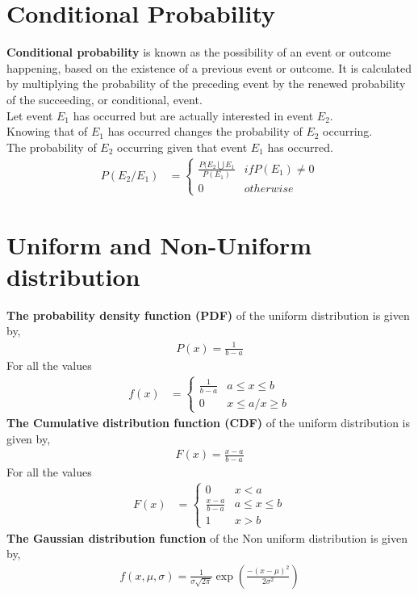 \documentclass[journal,15pt,twocolumn]{IEEEtran}
\begin{document}
\section {\textbf{Conditional Probability}}
\textbf{Conditional probability} is known as the possibility of an event or outcome happening, based on the existence of a previous event or outcome.
It is calculated by multiplying the probability of the preceding event by the renewed probability of the succeeding, or conditional, event.\\
Let event $E_1$ has occurred but are actually interested in event $E_2$.\\
Knowing that of $E_1$ has occurred changes the probability of $E_2$ occurring.\\
The probability of $E_2$ occurring given that event $E_1$ has occurred.
\begin{align}
P(E_2 / E_1) &= 
\begin{cases}
\frac{P(E_2\bigcup E_1}{P(E_1)} & if P(E_1) \neq 0\\
0 & otherwise
\end{cases}
\end{align}
\section {\textbf{Uniform and Non-Uniform distribution}}
\textbf{The probability density function (PDF)} of the uniform distribution is given by, 
\begin{align}
    P(x) = \frac{1}{b-a}
\end{align}
For all the values
\begin{align}
	f(x) &=
	\begin{cases}
		\frac{1}{b-a} & a\le x \le b\\
		0 & x \le a / x \ge b
	\end{cases}
\end{align}
\textbf{The Cumulative distribution function (CDF)} of the uniform distribution is given by, 
\begin{align}
    F(x) = \frac{x-a}{b-a}
\end{align}
For all the values
\begin{align}
	F(x) &=
	\begin{cases}
            0 & x < a\\
		\frac{x-a}{b-a} & a \le x \le b\\
		1 & x > b 
	\end{cases}
\end{align}
\textbf{The Gaussian distribution function} of the Non uniform distribution is given by,
\begin{align}
    f(x,\mu,\sigma) = \frac{1}{\sigma\sqrt{2\pi}} \exp \left( \frac{-(x-\mu)^2}{2\sigma^2} \right)
\end{align}
\end{document}
